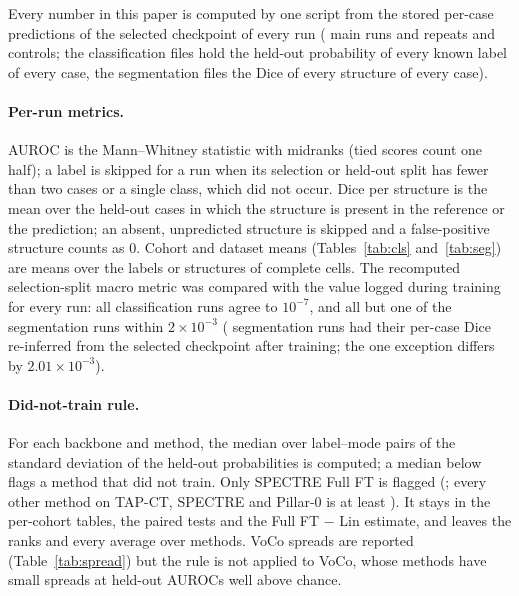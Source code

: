 Every number in this paper is computed by one script from the stored per-case predictions of the selected checkpoint of every run (\numRunsMainN{} main runs and \numRunsRevisionN{} repeats and controls; the classification files hold the held-out probability of every known label of every case, the segmentation files the Dice of every structure of every case).

\paragraph{Per-run metrics.} AUROC is the Mann--Whitney statistic with midranks (tied scores count one half); a label is skipped for a run when its selection or held-out split has fewer than two cases or a single class, which did not occur. Dice per structure is the mean over the held-out cases in which the structure is present in the reference or the prediction; an absent, unpredicted structure is skipped and a false-positive structure counts as 0. Cohort and dataset means (Tables~\ref{tab:cls} and~\ref{tab:seg}) are means over the labels or structures of complete cells. The recomputed selection-split macro metric was compared with the value logged during training for every run: all \numSelcheckClsRunsN{} classification runs agree to $10^{-7}$, and all but one of the \numSelcheckSegRunsN{} segmentation runs within $2\times10^{-3}$ (\numSegrecompRunsN{} segmentation runs had their per-case Dice re-inferred from the selected checkpoint after training; the one exception differs by $2.01\times10^{-3}$).

\paragraph{Did-not-train rule.} For each backbone and method, the median over label--mode pairs of the standard deviation of the held-out probabilities is computed; a median below \numSpreadMinValue{} flags a method that did not train. Only SPECTRE Full FT is flagged (\numSpreadSpectreFullft{}; every other method on TAP-CT, SPECTRE and Pillar-0 is at least \numSpreadOthermin{}). It stays in the per-cohort tables, the paired tests and the Full FT $-$ Lin estimate, and leaves the ranks and every average over methods. VoCo spreads are reported (Table~\ref{tab:spread}) but the rule is not applied to VoCo, whose methods have small spreads at held-out AUROCs well above chance.

